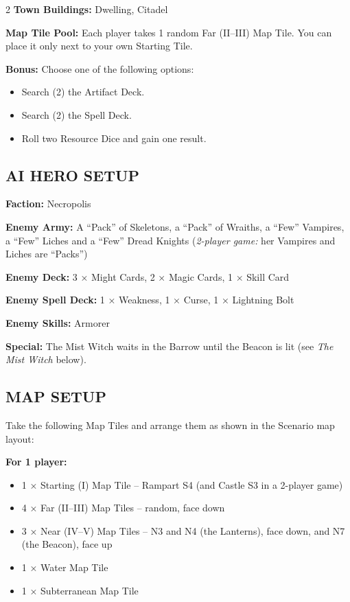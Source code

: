 \begin{multicols*}{2}
\textbf{Town Buildings:}  Dwelling, Citadel

\textbf{Map Tile Pool:} Each player takes 1 random Far (II--III) Map Tile. You can place it only next to your own Starting Tile.

\textbf{Bonus:} Choose one of the following options:
\begin{itemize}
  \item Search (2) the Artifact Deck.
  \item Search (2) the Spell Deck.
  \item Roll two Resource Dice and gain one result.
\end{itemize}

\subsection*{\MakeUppercase{AI Hero Setup}}

\textbf{Faction:} Necropolis

\textbf{Enemy Army:} A ``Pack'' of Skeletons, a ``Pack'' of Wraiths, a ``Few'' Vampires, a ``Few'' Liches and a ``Few'' Dread Knights (\textit{2-player game:} her Vampires and Liches are ``Packs'')

\textbf{Enemy Deck:} 3 × Might Cards, 2 × Magic Cards, 1 × Skill Card

\textbf{Enemy Spell Deck:} 1 × Weakness, 1 × Curse, 1 × Lightning Bolt

\textbf{Enemy Skills:} Armorer

\textbf{Special:} The Mist Witch waits in the Barrow until the Beacon is lit (see \textit{The Mist Witch} below).

\subsection*{\MakeUppercase{Map Setup}}

Take the following Map Tiles and arrange them as shown in the Scenario map layout:

\textbf{For 1 player:}
\begin{itemize}
  \item 1 × Starting (I) Map Tile -- Rampart S4 (and Castle S3 in a 2-player game)
  \item 4 × Far (II--III) Map Tiles -- random, face down
  \item 3 × Near (IV--V) Map Tiles -- N3 and N4 (the Lanterns), face down, and N7 (the Beacon), face up
  \item 1 × Water Map Tile
  \item 1 × Subterranean Map Tile
\end{itemize}


\end{multicols*}
